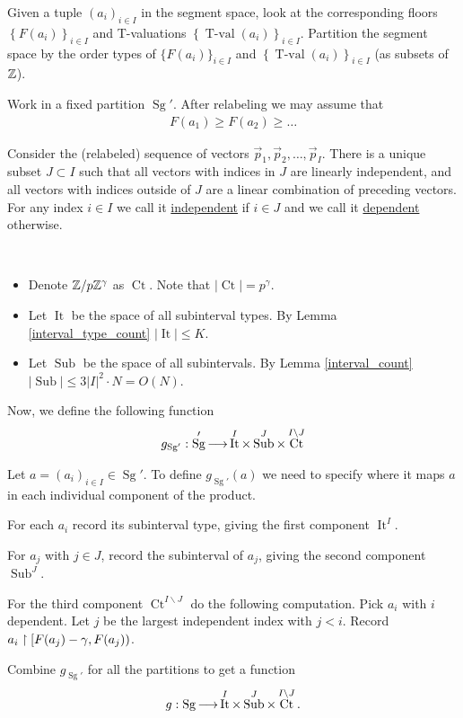 \documentclass{amsart}
\newcommand{\curly}[1]{\left\{#1\right\}}
\DeclareMathOperator{\Sg}{Sg}
\DeclareMathOperator{\It}{It}
\DeclareMathOperator{\Sub}{Sub}
\DeclareMathOperator{\Ct}{Ct}
\DeclareMathOperator{\tval}{T-val}
\newcommand{\defn}{\underline}
\begin{document}
Given a tuple $(a_i)_{i\in I}$ in the segment space,
look at the corresponding floors $\curly{F(a_i)}_{i\in I}$ and T-valuations $\curly{\tval(a_i)}_{i\in I}$.
Partition the segment space by the order types of $\{F(a_i)\}_{i\in I}$ and $\curly{\tval(a_i)}_{i\in I}$ (as subsets of $\mathbb{Z}$).

Work in a fixed partition $\Sg'$.
After relabeling we may assume that
\begin{align*}
  F(a_1) \geq F(a_2) \geq \ldots 
\end{align*}

Consider the (relabeled) sequence of vectors $\vec p_1, \vec p_2, \ldots, \vec p_I$.
There is a unique subset $J \subset I$ such that all vectors with indices in $J$ are linearly independent,
and all vectors with indices outside of $J$ are a linear combination of preceding vectors.
For any index $i \in I$ we call it \defn{independent} if $i \in J$ and we call it \defn{dependent} otherwise.


\begin{Definition} \ 
  \begin{itemize}
  \item Denote $\mathbb{Z}/p\mathbb{Z}^\gamma$ as \defn{$\Ct$}.
    Note that $|\Ct| = p^\gamma$.
  \item Let \defn{$\It$} be the space of all subinterval types.
    By Lemma \ref{interval_type_count} $|\It| \leq K$.
  \item Let \defn{$\Sub$} be the space of all subintervals.
    By Lemma \ref{interval_count} $|\Sub| \leq 3 |I|^2 \cdot N = O(N)$.
  \end{itemize}
\end{Definition}

\begin{Definition}
  Now, we define the following function
  \begin{align*}
    g_{\Sg'}: \Sg' \arr \It^I \times \Sub^J \times \Ct^{I \backslash J}
  \end{align*}

  Let $a = (a_i)_{i\in I} \in \Sg'$.
  To define $g_{\Sg'}(a)$ we need to specify where it maps $a$ in each individual component of the product.

  For each $a_i$ record its subinterval type, giving the first component $\It^I$.

  For $a_j$ with $j \in J$, record the subinterval of $a_j$, giving the second component $\Sub^J$.

  For the third component $\Ct^{I \backslash J}$ do the following computation.
  Pick $a_i$ with $i$ dependent.
  Let $j$ be the largest independent index with $j < i$.
  Record $a_i \upharpoonright [F(a_j) - \gamma, F(a_j))$.

  Combine $g_{\Sg'}$ for all the partitions to get a function 
  \begin{align*}
    g: \Sg \arr \It^I \times \Sub^J \times \Ct^{I \backslash J}.  
  \end{align*}
\end{Definition}
\end{document}
